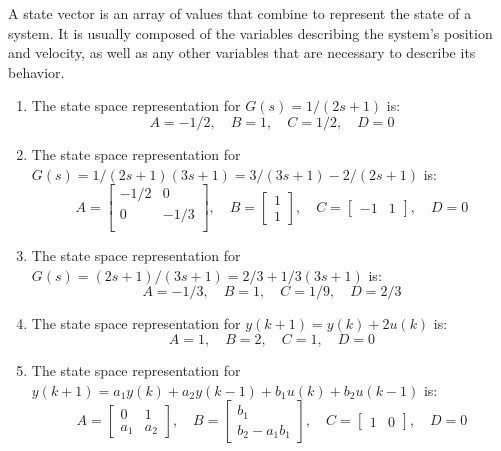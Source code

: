 \documentclass[11pt,a4paper]{report}
\theoremstyle{definition}\newtheorem{exercise}{Exercise}[chapter]
\begin{document}
\begin{answer}
A state vector is an array of values that combine to represent the state of a system. It is usually composed of the variables describing the system's position and velocity, as well as any other variables that are necessary to describe its behavior. 

\begin{enumerate}[label=(\alph*)]
\item The state space representation for $G(s)=1/(2s+1)$ is:
\begin{equation}
    A = -1/2,\quad
    B = 1,\quad
    C = 1/2,\quad
    D = 0
\end{equation}

\item The state space representation for $G(s) = 1/(2s+1)(3s+1)= 3/(3s+1)-2/(2s+1)$ is:
\begin{equation}
    A = \begin{bmatrix}
         -1/2 & 0 \\
         0 & -1/3 \\
        \end{bmatrix},\quad
    B = \begin{bmatrix} 1 \\ 1 \end{bmatrix},\quad
    C = \begin{bmatrix} -1 & 1 \end{bmatrix},\quad
    D = 0
\end{equation}

\item The state space representation for $G(s) = (2s+1)/(3s+1)=2/3+1/3(3s+1)$ is:
\begin{equation}
    A = -1/3,\quad
    B = 1,\quad
    C = 1/9,\quad
    D = 2/3
\end{equation}

\item The state space representation for $y(k+1)=y(k)+2u(k)$ is:
\begin{equation}
    A = 1,\quad
    B = 2,\quad
    C = 1,\quad
    D = 0
\end{equation}

\item The state space representation for $y(k+1)=a_1 y(k)+a_2 y(k-1)+b_1 u(k)+b_2 u(k-1)$ is\cite{StateSpaceRepresentation}:
\begin{equation}
    A = \begin{bmatrix} 0 & 1 \\ a_1 & a_2 \end{bmatrix},\quad
    B = \begin{bmatrix} b_1 \\ b_2-a_1 b_1 \end{bmatrix},\quad
    C = \begin{bmatrix} 1 & 0 \end{bmatrix},\quad
    D = 0
    \end{equation}
\end{enumerate}


\end{answer}
\end{document}
